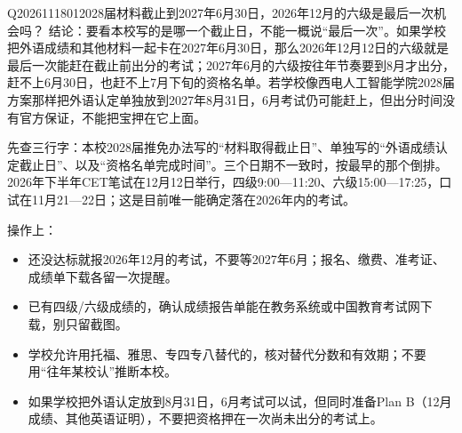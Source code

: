 \begin{qa}{Q2026111801}{2028届材料截止到2027年6月30日，2026年12月的六级是最后一次机会吗？}
结论：要看本校写的是哪一个截止日，不能一概说“最后一次”。如果学校把外语成绩和其他材料一起卡在2027年6月30日，那么2026年12月12日的六级就是最后一次能赶在截止前出分的考试；2027年6月的六级按往年节奏要到8月才出分，赶不上6月30日，也赶不上7月下旬的资格名单。若学校像西电人工智能学院2028届方案那样把外语认定单独放到2027年8月31日，6月考试仍可能赶上，但出分时间没有官方保证，不能把宝押在它上面。

先查三行字：本校2028届推免办法写的“材料取得截止日”、单独写的“外语成绩认定截止日”、以及“资格名单完成时间”。三个日期不一致时，按最早的那个倒排。2026年下半年CET笔试在12月12日举行，四级9:00—11:20、六级15:00—17:25，口试在11月21—22日；这是目前唯一能确定落在2026年内的考试。

操作上：

\begin{itemize}
\item 还没达标就报2026年12月的考试，不要等2027年6月；报名、缴费、准考证、成绩单下载各留一次提醒。
\item 已有四级/六级成绩的，确认成绩报告单能在教务系统或中国教育考试网下载，别只留截图。
\item 学校允许用托福、雅思、专四专八替代的，核对替代分数和有效期；不要用“往年某校认”推断本校。
\item 如果学校把外语认定放到8月31日，6月考试可以试，但同时准备Plan B（12月成绩、其他英语证明），不要把资格押在一次尚未出分的考试上。
\end{itemize}
\end{qa}

